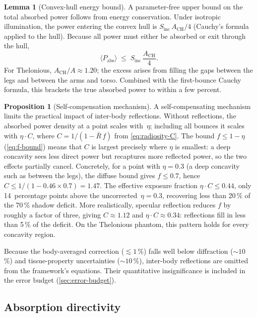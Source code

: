 \documentclass[11pt,a4paper]{article}
\theoremstyle{definition}      %
\newtheorem{proposition}[proposition]{Proposition}
\newtheorem{lemma}[lemma]{Lemma}
\newcommand{\Sinc}{S_{\mathrm{inc}}}
\begin{document}
\begin{lemma}[Convex-hull energy bound]
A parameter-free upper bound on the total absorbed power follows from
energy conservation.  Under isotropic illumination, the power entering
the convex hull is $\Sinc\,A_{\mathrm{CH}}/4$ (Cauchy's formula
applied to the hull).  Because all power must either be absorbed or
exit through the hull,
\begin{equation}\label{eq:CH-bound}
  \langle P_{\mathrm{abs}}\rangle \;\le\; \Sinc\,\frac{A_{\mathrm{CH}}}{4}.
\end{equation}
For Thelonious, $A_{\mathrm{CH}}/A\approx 1.20$; the excess arises
from filling the gaps between the legs and between the arms and torso.
Combined with the first-bounce Cauchy formula, this brackets the true
absorbed power to within a few percent.
\end{lemma}

\begin{proposition}[Self-compensation mechanism]
A self-compensating mechanism limits the practical impact of inter-body
reflections.  Without reflections, the absorbed power density at a
point scales with~$\eta$; including all bounces it scales with
$\eta\cdot C$, where $C=1/(1-\bar R\,f)$ from \cref{eq:radiosity-C}.
The bound $f\le 1-\eta$ (\cref{eq:f-bound}) means that $C$ is largest
precisely where $\eta$ is smallest: a deep concavity sees less direct
power but recaptures more reflected power, so the two effects partially
cancel.  Concretely, for a point with $\eta=0.3$ (a deep concavity
such as between the legs), the diffuse bound gives
$f\le 0.7$, hence $C\le 1/(1-0.46\times 0.7)=1.47$.  The effective
exposure fraction $\eta\cdot C\le 0.44$, only 14~percentage points
above the uncorrected~$\eta=0.3$, recovering less than 20\,\% of the
70\,\% shadow deficit.  More realistically, specular reflection
reduces $f$ by roughly a factor of three, giving $C\approx 1.12$ and
$\eta\cdot C\approx 0.34$: reflections fill in less than 5\,\% of
the deficit.  On the Thelonious phantom, this pattern holds for every
concavity region.
\end{proposition}

Because the body-averaged correction ($\lesssim 1$\,\%) falls well
below diffraction (${\sim}10$\,\%) and tissue-property uncertainties
(${\sim}10$\,\%), inter-body reflections are omitted from the
framework's equations.  Their quantitative insignificance is included
in the error budget (\cref{sec:error-budget}).

\subsection{Absorption directivity}\label{sec:directivity}
\end{document}
